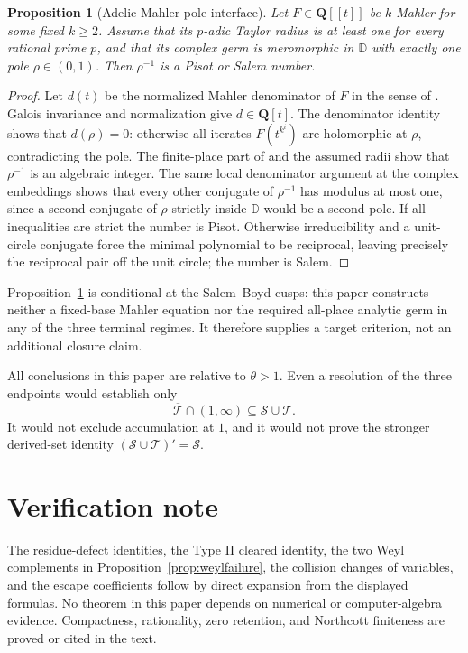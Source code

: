 \documentclass[11pt,reqno]{amsart}
\newtheorem{proposition}[theorem]{Proposition}
\theoremstyle{definition}
\theoremstyle{remark}
\newcommand{\D}{\mathbb D}
\newcommand{\Q}{\mathbf Q}
\newcommand{\calS}{\mathcal S}
\newcommand{\calT}{\mathcal T}
\begin{document}
\begin{proposition}[Adelic Mahler pole interface]\label{prop:Mahlerinterface}
Let $F\in\Q[[t]]$ be $k$-Mahler for some fixed $k\ge2$.  Assume that its
$p$-adic Taylor radius is at least one for every rational prime $p$, and that
its complex germ is meromorphic in $\D$ with exactly one pole
$\rho\in(0,1)$.  Then $\rho^{-1}$ is a Pisot or Salem number.
\end{proposition}

\begin{proof}
Let $d(t)$ be the normalized Mahler denominator of $F$ in the sense of
\cite[Def.~3.9]{abs}.  Galois invariance and normalization give
$d\in\Q[t]$.  The denominator identity shows that $d(\rho)=0$: otherwise
all iterates $F(t^{k^i})$ are holomorphic at $\rho$, contradicting the pole.
The finite-place part of \cite[Prop.~6.4]{abs} and the assumed radii show
that $\rho^{-1}$ is an algebraic integer.  The same local denominator
argument at the complex embeddings shows that every other conjugate of
$\rho^{-1}$ has modulus at most one, since a second conjugate of $\rho$
strictly inside $\D$ would be a second pole.  If all inequalities are strict
the number is Pisot.  Otherwise irreducibility and a unit-circle conjugate
force the minimal polynomial to be reciprocal, leaving precisely the
reciprocal pair off the unit circle; the number is Salem.
\end{proof}

Proposition~\ref{prop:Mahlerinterface} is conditional at the Salem--Boyd
cusps: this paper constructs neither a fixed-base Mahler equation nor the
required all-place analytic germ in any of the three terminal regimes.  It
therefore supplies a target criterion, not an additional closure claim.

All conclusions in this paper are relative to $\theta>1$.  Even a resolution
of the three endpoints would establish only
\[
 \overline{\calT}\cap(1,\infty)\subseteq\calS\cup\calT.
\]
It would not exclude accumulation at $1$, and it would not prove the stronger
derived-set identity $(\calS\cup\calT)'=\calS$.

\section*{Verification note}

The residue-defect identities, the Type II cleared identity, the two Weyl
complements in Proposition~\ref{prop:weylfailure}, the collision changes of
variables, and the escape coefficients follow by direct expansion from the
displayed formulas.  No theorem in this paper depends on numerical or
computer-algebra evidence.  Compactness, rationality, zero retention, and
Northcott finiteness are proved or cited in the text.
\end{document}
